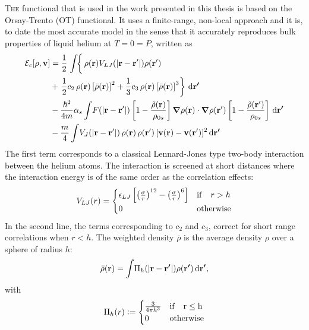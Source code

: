 \documentclass[12pt,a4paper,twosides]{book}
\renewcommand{\vec}[1]{\bm{\mathrm{#1}}}
\newcommand{\diff}[1]{\,\mathrm{d}{\vec{#1}}}
\begin{document}
		\lettrine[lines=3,findent=3pt,nindent=0pt]{T}{he} functional that is used in the work presented in this thesis is based on the Orsay-Trento (OT) functional. It uses a finite-range, non-local approach and it is, to date the most accurate model in the sense that it accurately reproduces bulk properties of liquid helium at $T=0=P$, written as		
		\begin{align}
			{\cal E}_c[\rho ,\mathbf{v}] &=  
			\frac{1}{2} \left.\int \! \right\{\rho({\bf r}) V_{LJ}(|{\bf r}-{\bf r'}|) \rho({\bf r'}) \nonumber \\
			&+ \left.\frac{1}{2} c_2\, \rho({\bf r}) \left[{\bar \rho}({\bf r}) \right]^2 
			+ \frac{1}{3} c_3 \, \rho({\bf r}) \left[ {\bar \rho}({\bf r}) \right]^3\right\}\diff{r'} \nonumber \\
			&- \frac{\hbar^2}{4m} \alpha_s \int \! F(|{\bf r}-{\bf r'}|) \left[ 1- \frac{{\tilde \rho}({\bf r})}{\rho_{0s}} \right]\grad{\rho({\bf r})} \cdot \grad{\rho({\bf r'})} \left[ 1- \frac{{\tilde \rho}({\bf r'})}{\rho_{0s}} \right]\diff{r'} \nonumber \\
			& - \frac{m}{4} \int \! V_J(| \mathbf{r} - \mathbf{r}'|)\, \rho(\mathbf{r}) \, \rho(\mathbf{r}')\,  [\mathbf{v}(\mathbf{r})-\mathbf{v}(\mathbf{r}')]^2\diff{r'} \label{eq:otf}
		\end{align}
		The first term corresponds to a classical Lennard-Jones type two-body interaction between the helium atoms. The interaction is screened at short distances where the interaction energy is of the same order as the correlation effects:
		\begin{align}
			V_{LJ}(r) = \begin{cases}
			\epsilon_{LJ} \left[\left(\frac{\sigma}{r} \right)^{12} - \left(\frac{\sigma}{r} \right)^{6} \right] & {\rm if} \quad r > h \\
			0 & {\rm otherwise}
			\end{cases}\label{eq9}
		\end{align}
		In the second line, the terms corresponding to $c_2$ and $c_3$, correct for short range correlations when $r<h$. The weighted density $\bar{\rho}$ is the average density $\rho$ over a sphere of radius $h$:
		\begin{align}
			\bar{\rho}(\vec{r}) = \int\!\Pi_h\qty(\abs{\vec{r}-\vec{r'}})\rho({\vec{r'}})\diff{r'},
		\end{align}
		with
		\begin{align}
			\Pi_h(r) \vcentcolon= \begin{cases}
				\frac{3}{4\pi h^3} & \rm{if} \quad r\leq h \\
				0 & \rm{otherwise}
			\end{cases}
		\end{align}
\end{document}
